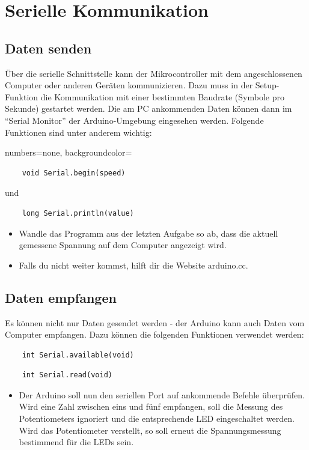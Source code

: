 \documentclass[10pt,a4paper]{article}
\begin{document}
\section{Serielle Kommunikation}
\subsection{Daten senden}
Über die serielle Schnittstelle kann der Mikrocontroller mit dem angeschlossenen Computer oder anderen Geräten kommunizieren. Dazu muss in der Setup-Funktion die Kommunikation mit einer bestimmten Baudrate (Symbole pro Sekunde) gestartet werden. Die am PC ankommenden Daten können dann im "`Serial Monitor"' der Arduino-Umgebung eingesehen werden. Folgende Funktionen sind unter anderem wichtig:

\lstset
{
	numbers=none,
	backgroundcolor=\color[gray]{0.85}
}
\begin{lstlisting}
	void Serial.begin(speed)
\end{lstlisting}
und
\begin{lstlisting}
	long Serial.println(value)
\end{lstlisting}

\begin{itemize}
	\item Wandle das Programm aus der letzten Aufgabe so ab, dass die aktuell gemessene Spannung auf dem Computer angezeigt wird.
	\item Falls du nicht weiter kommst, hilft dir die Website arduino.cc.
\end{itemize}

\subsection{Daten empfangen}
Es können nicht nur Daten gesendet werden - der Arduino kann auch Daten vom Computer empfangen. Dazu können die folgenden Funktionen verwendet werden:

\begin{lstlisting}
	int Serial.available(void)
\end{lstlisting}
\begin{lstlisting}
	int Serial.read(void)
\end{lstlisting}

\begin{itemize}
	\item Der Arduino soll nun den seriellen Port auf ankommende Befehle überprüfen. Wird eine Zahl zwischen eins und fünf empfangen, soll die Messung des Potentiometers ignoriert und die entsprechende LED eingeschaltet werden. Wird das Potentiometer verstellt, so soll erneut die Spannungsmessung bestimmend für die LEDs sein.
\end{itemize}
\end{document}
